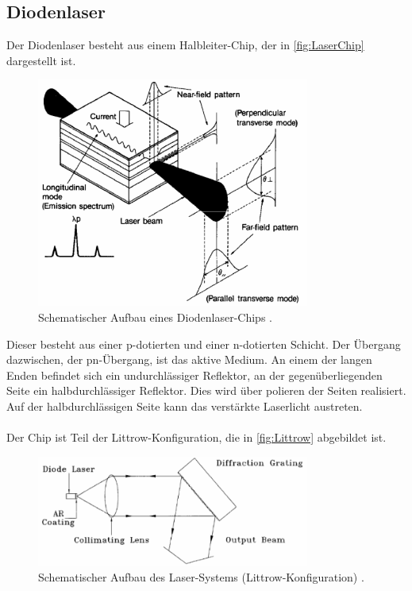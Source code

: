 \subsection{Diodenlaser}
Der Diodenlaser besteht aus einem Halbleiter-Chip, der in \autoref{fig:LaserChip} 
dargestellt ist.
\begin{figure}
    \centering
    \includegraphics[width=0.8\textwidth]{LaserChip.png}
    \caption{Schematischer Aufbau eines Diodenlaser-Chips \cite{ap60}.}
    \label{fig:LaserChip}
\end{figure}
Dieser besteht aus einer p-dotierten und einer n-dotierten Schicht. Der Übergang 
dazwischen, der pn-Übergang, ist das aktive Medium. An einem der langen Enden befindet sich ein 
undurchlässiger Reflektor, an der gegenüberliegenden Seite ein halbdurchlässiger Reflektor. Dies wird über 
polieren der Seiten realisiert. Auf der halbdurchlässigen Seite kann das verstärkte Laserlicht austreten.
\\
\\
Der Chip ist Teil der Littrow-Konfiguration, die in \autoref{fig:Littrow} abgebildet ist. 
\begin{figure}
    \centering
    \includegraphics[width=0.8\textwidth]{LittrowSetup.png}
    \caption{Schematischer Aufbau des Laser-Systems (Littrow-Konfiguration) \cite{ap60}.}
    \label{fig:Littrow}
\end{figure}
